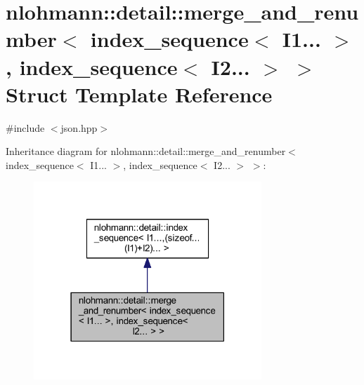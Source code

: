\hypertarget{structnlohmann_1_1detail_1_1merge__and__renumber_3_01index__sequence_3_01_i1_8_8_8_01_4_00_01indf5ec8c9c7b5107e4b381e3ca4c1be2ca}{}\section{nlohmann\+::detail\+::merge\+\_\+and\+\_\+renumber$<$ index\+\_\+sequence$<$ I1... $>$, index\+\_\+sequence$<$ I2... $>$ $>$ Struct Template Reference}
\label{structnlohmann_1_1detail_1_1merge__and__renumber_3_01index__sequence_3_01_i1_8_8_8_01_4_00_01indf5ec8c9c7b5107e4b381e3ca4c1be2ca}


{\ttfamily \#include $<$json.\+hpp$>$}



Inheritance diagram for nlohmann\+::detail\+::merge\+\_\+and\+\_\+renumber$<$ index\+\_\+sequence$<$ I1... $>$, index\+\_\+sequence$<$ I2... $>$ $>$\+:
\nopagebreak
\begin{figure}[H]
\begin{center}
\leavevmode
\includegraphics[width=243pt]{structnlohmann_1_1detail_1_1merge__and__renumber_3_01index__sequence_3_01_i1_8_8_8_01_4_00_01ind6c27662b24eb9b5dea448f2c0400428a}
\end{center}
\end{figure}


